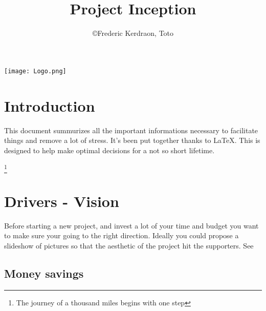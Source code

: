 \documentclass[8pt]{article} %
\title{Project Inception}
\author{\copyright Frederic Kerdraon, Toto}
\begin{document}
\maketitle
\hspace*{-1cm}\texttt{[image: Logo.png]}
\tableofcontents

\section{Introduction}

This document summurizes all the important informations necessary to facilitate things and remove a lot of stress. It's been put together thanks to \LaTeX. This is designed to help make optimal decisions for a not so short lifetime.

\footnote{The journey of a thousand miles begins with one step}
%


\newcommand{\slice}[4]{
  \pgfmathparse{0.5*#1+0.5*#2}
  \let\midangle\pgfmathresult

   slice
  \draw[thick,fill=black!10] (0,0) -- (#1:1) arc (#1:#2:1) -- cycle;

   outer label
  \node[label=\midangle:#4] at (\midangle:1) {};

   inner label
  \pgfmathparse{min((#2-#1-10)/110*(-0.3),0)}
  \let\temp\pgfmathresult
  \pgfmathparse{max(\temp,-0.5) + 0.8}
  \let\innerpos\pgfmathresult
  \node at (\midangle:\innerpos) {#3};
}

\section{Drivers - Vision}
Before starting a new project, and invest a lot of your time and budget you want to make sure your going to the right direction. 
Ideally you could propose a slideshow of pictures so that the aesthetic of the project hit the supporters.
See 
\subsection{Money savings}
\end{document}
